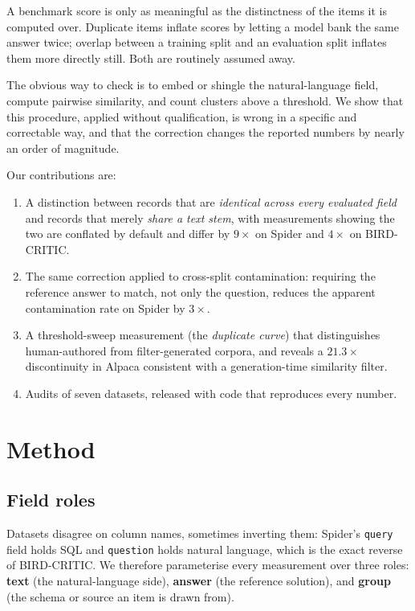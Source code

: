 \documentclass[11pt]{article}
\begin{document}
A benchmark score is only as meaningful as the distinctness of the items it is
computed over. Duplicate items inflate scores by letting a model bank the same
answer twice; overlap between a training split and an evaluation split inflates
them more directly still. Both are routinely assumed away.

The obvious way to check is to embed or shingle the natural-language field,
compute pairwise similarity, and count clusters above a threshold. We show that
this procedure, applied without qualification, is wrong in a specific and
correctable way, and that the correction changes the reported numbers by nearly
an order of magnitude.

Our contributions are:

\begin{enumerate}
\item A distinction between records that are \emph{identical across every
evaluated field} and records that merely \emph{share a text stem}, with
measurements showing the two are conflated by default and differ by $9\times$
on Spider and $4\times$ on BIRD-CRITIC.

\item The same correction applied to cross-split contamination: requiring the
reference answer to match, not only the question, reduces the apparent
contamination rate on Spider by $3\times$.

\item A threshold-sweep measurement (the \emph{duplicate curve}) that
distinguishes human-authored from filter-generated corpora, and reveals a
$21.3\times$ discontinuity in Alpaca consistent with a generation-time
similarity filter.

\item Audits of seven datasets, released with code that reproduces every
number.
\end{enumerate}

\section{Method}

\subsection{Field roles}

Datasets disagree on column names, sometimes inverting them: Spider's
\texttt{query} field holds SQL and \texttt{question} holds natural language,
which is the exact reverse of BIRD-CRITIC. We therefore parameterise every
measurement over three roles: \textbf{text} (the natural-language side),
\textbf{answer} (the reference solution), and \textbf{group} (the schema or
source an item is drawn from).
\end{document}
